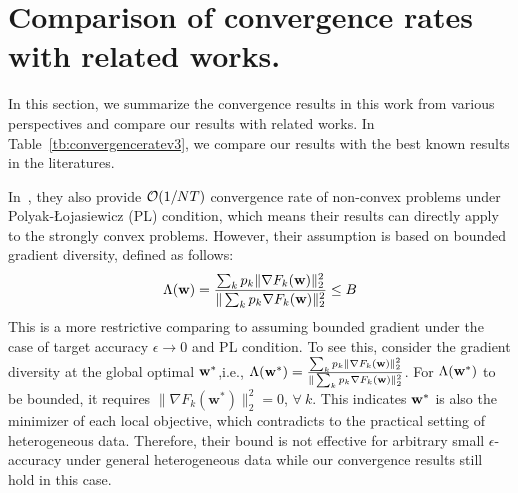 

\section{Comparison of convergence rates with related works.}
\label{sec:app:comparison}
In this section, we summarize the convergence results in this work from various perspectives
and compare our results with related works. 
In Table~\ref{tb:convergenceratev3}, we compare our 
results with the best known results in the literatures. 

In~\cite{haddadpour2019convergence}, they also provide ${\mathcal{O}}(1/NT)$ convergence rate of non-convex problems under Polyak-Łojasiewicz (PL) condition, which
means their results can directly apply to the strongly convex problems. However, their assumption is based on bounded gradient diversity, defined as follows: 
\begin{align*}
	\Lambda({\mathbf{w}}) = \frac{\sum_{k}p_{k}\|\nabla F_{k}(\mathbf{w})\|_{2}^{2}}{\|\sum_{k}p_{k}\nabla F_{k}(\mathbf{w})\|_{2}^{2}} \leq B
\end{align*} 
This is a more restrictive comparing to assuming bounded gradient under the case of target accuracy $\epsilon \rightarrow 0$ and PL condition.
To see this, consider the gradient diversity at the global optimal ${\mathbf{w}}^*$,i.e., $\Lambda({\mathbf{w}}^*) = \frac{\sum_{k}p_{k}\|\nabla F_{k}(\mathbf{w})\|_{2}^{2}}{\|\sum_{k}p_{k}\nabla F_{k}(\mathbf{w})\|_{2}^{2}}$. For $\Lambda({\mathbf{w}}^*)$ to be bounded, it requires $\|\nabla F_{k}(\mathbf{w}^*)\|_{2}^{2} = 0$, $\forall \ k$. This indicates 
${\mathbf{w}}^*$ is also the minimizer of each local objective, which contradicts to the practical setting of heterogeneous data. Therefore, their bound 
is not effective for arbitrary small $\epsilon$-accuracy under general heterogeneous data while our convergence results still hold in this case.

